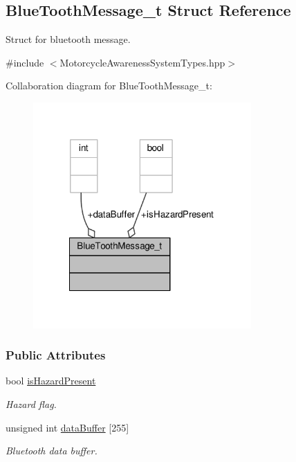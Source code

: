 \hypertarget{structBlueToothMessage__t}{\subsection{Blue\-Tooth\-Message\-\_\-t Struct Reference}
\label{structBlueToothMessage__t}
}


Struct for bluetooth message.  




{\ttfamily \#include $<$Motorcycle\-Awareness\-System\-Types.\-hpp$>$}



Collaboration diagram for Blue\-Tooth\-Message\-\_\-t\-:\nopagebreak
\begin{figure}[H]
\begin{center}
\leavevmode
\includegraphics[width=236pt]{structBlueToothMessage__t__coll__graph}
\end{center}
\end{figure}
\subsubsection*{Public Attributes}
\begin{DoxyCompactItemize}
\item 
bool \hyperlink{structBlueToothMessage__t_a2dd315aa1cba1d2d3045e26b9f171e61}{is\-Hazard\-Present}
\begin{DoxyCompactList}\small\item\em Hazard flag. \end{DoxyCompactList}\item 
unsigned int \hyperlink{structBlueToothMessage__t_ab872789a32f068dae8bcf77122256b78}{data\-Buffer} \mbox{[}255\mbox{]}
\begin{DoxyCompactList}\small\item\em Bluetooth data buffer. \end{DoxyCompactList}\end{DoxyCompactItemize}


